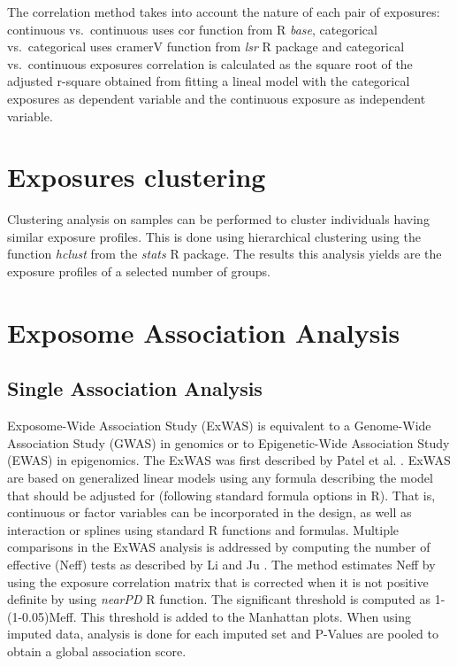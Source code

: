 \documentclass[
]{book}
\begin{document}
The correlation method takes into account the nature of each pair of exposures: continuous vs.~continuous uses cor function from R \emph{base}, categorical vs.~categorical uses cramerV function from \emph{lsr} R package and categorical vs.~continuous exposures correlation is calculated as the square root of the adjusted r-square obtained from fitting a lineal model with the categorical exposures as dependent variable and the continuous exposure as independent variable.

\hypertarget{exposures-clustering}{%
\section{Exposures clustering}\label{exposures-clustering}}

Clustering analysis on samples can be performed to cluster individuals having similar exposure profiles. This is done using hierarchical clustering using the function \emph{hclust} from the \emph{stats} R package. The results this analysis yields are the exposure profiles of a selected number of groups.

\hypertarget{exposome-association-analysis}{%
\section{Exposome Association Analysis}\label{exposome-association-analysis}}

\hypertarget{single-association-analysis}{%
\subsection{Single Association Analysis}\label{single-association-analysis}}

Exposome-Wide Association Study (ExWAS) is equivalent to a Genome-Wide Association Study (GWAS) in genomics or to Epigenetic-Wide Association Study (EWAS) in epigenomics. The ExWAS was first described by Patel et al. \citet{patel2010environment} . ExWAS are based on generalized linear models using any formula describing the model that should be adjusted for (following standard formula options in R). That is, continuous or factor variables can be incorporated in the design, as well as interaction or splines using standard R functions and formulas. Multiple comparisons in the ExWAS analysis is addressed by computing the number of effective (Neff) tests as described by Li and Ju \citet{li2005adjusting} . The method estimates Neff by using the exposure correlation matrix that is corrected when it is not positive definite by using \emph{nearPD} R function. The significant threshold is computed as 1-(1-0.05)Meff. This threshold is added to the Manhattan plots. When using imputed data, analysis is done for each imputed set and P-Values are pooled to obtain a global association score.
\end{document}
